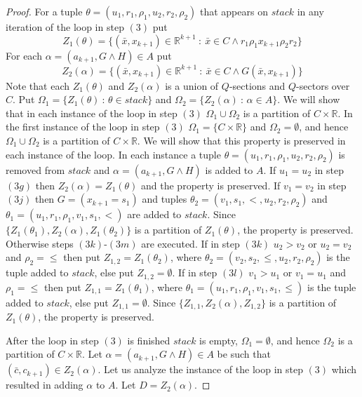 \documentclass[english]{amsart}
\numberwithin{equation}{section}
\numberwithin{figure}{section}
\begin{document}
\begin{proof}
For a tuple $\theta=(u_{1},r_{1},\rho_{1},u_{2},r_{2},\rho_{2})$
that appears on $stack$ in any iteration of the loop in step $(3)$
put\[
Z_{1}(\theta)=\{(\bar{x},x_{k+1})\in\mathbb{R}^{k+1}\::\:\bar{x}\in C\wedge r_{1}\rho_{1}x_{k+1}\rho_{2}r_{2}\}\]
For each $\alpha=(a_{k+1},G\wedge H)\in A$ put \[
Z_{2}(\alpha)=\{(\bar{x},x_{k+1})\in\mathbb{R}^{k+1}\::\:\bar{x}\in C\wedge G(\bar{x},x_{k+1})\}\]
Note that each $Z_{1}(\theta)$ and $Z_{2}(\alpha)$ is a union of
$Q$-sections and $Q$-sectors over $C$. Put $\Omega_{1}=\{Z_{1}(\theta)\::\,\theta\in stack\}$
and $\Omega_{2}=\{Z_{2}(\alpha)\::\,\alpha\in A\}$. We will show
that in each instance of the loop in step $(3)$ $\Omega_{1}\cup\Omega_{2}$
is a partition of $C\times\mathbb{R}$. In the first instance of the
loop in step $(3)$ $\Omega_{1}=\{C\times\mathbb{R}\}$ and $\Omega_{2}=\emptyset$,
and hence $\Omega_{1}\cup\Omega_{2}$ is a partition of $C\times\mathbb{R}$.
We will show that this property is preserved in each instance of the
loop. In each instance a tuple $\theta=(u_{1},r_{1},\rho_{1},u_{2},r_{2},\rho_{2})$
is removed from $stack$ and $\alpha=(a_{k+1},G\wedge H)$ is added
to $A$. If $u_{1}=u_{2}$ in step $(3g)$ then $Z_{2}(\alpha)=Z_{1}(\theta)$
and the property is preserved. If $v_{1}=v_{2}$ in step $(3j)$ then
$G=(x_{k+1}=s_{1})$ and tuples $\theta_{2}=(v_{1},s_{1},<,u_{2},r_{2},\rho_{2})$
and $\theta_{1}=(u_{1},r_{1},\rho_{1},v_{1},s_{1},<)$ are added to
$stack$. Since $\{Z_{1}(\theta_{1}),Z_{2}(\alpha),Z_{1}(\theta_{2})\}$
is a partition of $Z_{1}(\theta)$, the property is preserved. Otherwise
steps $(3k)$-$(3m)$ are executed. If in step $(3k)$ $u_{2}>v_{2}$
or $u_{2}=v_{2}$ and $\rho_{2}=\leq$ then put $Z_{1,2}=Z_{1}(\theta_{2})$,
where $\theta_{2}=(v_{2},s_{2},\leq,u_{2},r_{2},\rho_{2})$ is the
tuple added to $stack$, else put $Z_{1,2}=\emptyset$. If in step
$(3l)$ $v_{1}>u_{1}$ or $v_{1}=u_{1}$ and $\rho_{1}=\leq$ then
put $Z_{1,1}=Z_{1}(\theta_{1})$, where $\theta_{1}=(u_{1},r_{1},\rho_{1},v_{1},s_{1},\leq)$
is the tuple added to $stack$, else put $Z_{1,1}=\emptyset$. Since
$\{Z_{1,1},Z_{2}(\alpha),Z_{1,2}\}$ is a partition of $Z_{1}(\theta)$,
the property is preserved. 

After the loop in step $(3)$ is finished $stack$ is empty, $\Omega_{1}=\emptyset$,
and hence $\Omega_{2}$ is a partition of $C\times\mathbb{R}$. Let
$\alpha=(a_{k+1},G\wedge H)\in A$ be such that $(\bar{c},c_{k+1})\in Z_{2}(\alpha)$.
Let us analyze the instance of the loop in step $(3)$ which resulted
in adding $\alpha$ to $A$. Let $D=Z_{2}(\alpha)$. 


\end{proof}
\end{document}
